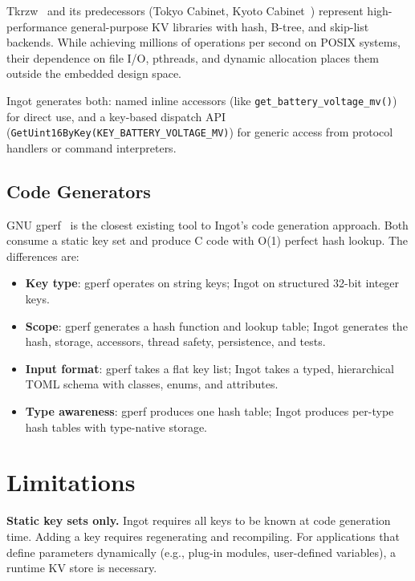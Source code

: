 \documentclass[10pt,twocolumn,letterpaper]{article}
\begin{document}
Tkrzw~\cite{tkrzw} and its predecessors (Tokyo Cabinet, Kyoto
Cabinet~\cite{kyoto-cabinet}) represent high-performance general-purpose
KV libraries with hash, B-tree, and skip-list backends.  While
achieving millions of operations per second on POSIX systems, their
dependence on file I/O, pthreads, and dynamic allocation places them
outside the embedded design space.

Ingot generates both: named inline accessors (like
\texttt{get\_battery\_voltage\_mv()}) for direct use, and a key-based
dispatch API (\texttt{GetUint16ByKey(KEY\_BATTERY\_VOLTAGE\_MV)}) for
generic access from protocol handlers or command interpreters.

\subsection{Code Generators}

GNU gperf~\cite{gperf} is the closest existing tool to Ingot's code
generation approach.  Both consume a static key set and produce C code
with O(1) perfect hash lookup.  The differences are:

\begin{itemize}
    \item \textbf{Key type}: gperf operates on string keys; Ingot on
        structured 32-bit integer keys.
    \item \textbf{Scope}: gperf generates a hash function and lookup
        table; Ingot generates the hash, storage, accessors, thread
        safety, persistence, and tests.
    \item \textbf{Input format}: gperf takes a flat key list; Ingot
        takes a typed, hierarchical TOML schema with classes, enums,
        and attributes.
    \item \textbf{Type awareness}: gperf produces one hash table;
        Ingot produces per-type hash tables with type-native storage.
\end{itemize}

\section{Limitations}
\label{sec:limitations}

\textbf{Static key sets only.}  Ingot requires all keys to be known
at code generation time.  Adding a key requires regenerating and
recompiling.  For applications that define parameters dynamically
(e.g., plug-in modules, user-defined variables), a runtime KV store
is necessary.
\end{document}
